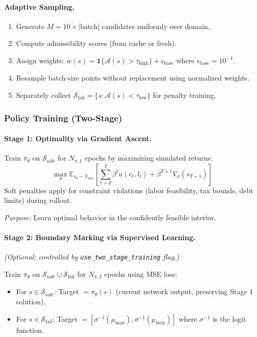 \paragraph{Adaptive Sampling.}
\begin{enumerate}
    \item Generate $M = 10 \times |\text{batch}|$ candidates uniformly over domain.
    \item Compute admissibility scores (from cache or fresh).
    \item Assign weights: $w(s) = \mathbf{1}\{\mathcal{A}(s) > \tau_{\text{high}}\} + \epsilon_{\text{base}}$ where $\epsilon_{\text{base}} = 10^{-4}$.
    \item Resample batch-size points without replacement using normalized weights.
    \item Separately collect $\mathcal{S}_{\text{fail}} = \{s : \mathcal{A}(s) < \tau_{\text{low}}\}$ for penalty training.
\end{enumerate}

\subsubsection{Policy Training (Two-Stage)}

\paragraph{Stage 1: Optimality via Gradient Ascent.}
Train $\pi_\theta$ on $\mathcal{S}_{\text{safe}}$ for $N_{\pi,1}$ epochs by maximizing simulated returns:
\begin{equation}
    \max_\theta \mathbb{E}_{s_0 \sim \mathcal{S}_{\text{safe}}} \left[ \sum_{t=0}^{T} \beta^t u(c_t, l_t) + \beta^{T+1} V_\phi(s_{T+1}) \right]
\end{equation}
Soft penalties apply for constraint violations (labor feasibility, tax bounds, debt limits) during rollout.

\textit{Purpose:} Learn optimal behavior in the confidently feasible interior.

\paragraph{Stage 2: Boundary Marking via Supervised Learning.}
\textit{(Optional; controlled by \texttt{use\_two\_stage\_training} flag.)}

Train $\pi_\theta$ on $\mathcal{S}_{\text{safe}} \cup \mathcal{S}_{\text{fail}}$ for $N_{\pi,2}$ epochs using MSE loss:
\begin{itemize}
    \item For $s \in \mathcal{S}_{\text{safe}}$: Target $= \pi_\theta(s)$ (current network output, preserving Stage 1 solution).
    \item For $s \in \mathcal{S}_{\text{fail}}$: Target $= [\sigma^{-1}(\mu_{\max}), \sigma^{-1}(\mu_{\max})]$ where $\sigma^{-1}$ is the logit function.
\end{itemize}

